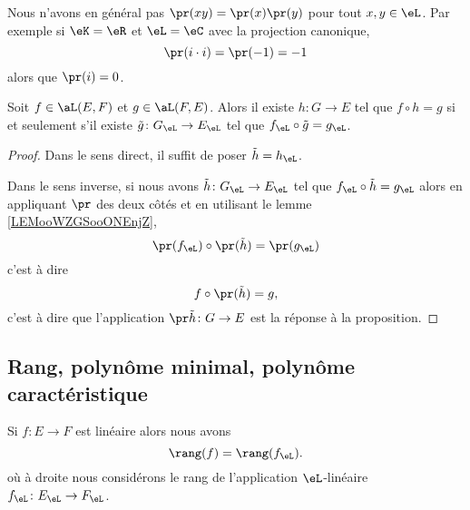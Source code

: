\begin{remark}
    Nous n'avons en général pas \( \pr(xy)=\pr(x)\pr(y)\) pour tout \( x,y\in \eL\). Par exemple si \( \eK=\eR\) et \( \eL=\eC\) avec la projection canonique,
    \begin{equation}
        \pr(i\cdot i)=\pr(-1)=-1
    \end{equation}
    alors que \( \pr(i)=0\).
\end{remark}

\begin{proposition}
    Soit \( f\in\aL(E,F)\) et \( g\in\aL(F,E)\). Alors il existe \( h\colon G\to E\) tel que \( f\circ h=g\) si et seulement s'il existe \( \tilde g\colon G_{\eL}\to E_{\eL}\) tel que \( f_{\eL}\circ \tilde g=g_{\eL}\).
\end{proposition}

\begin{proof}
    Dans le sens direct, il suffit de poser \( \tilde h=h_{\eL}\).

    Dans le sens inverse, si nous avons \( \tilde h\colon G_{\eL}\to E_{\eL}\) tel que \( f_{\eL}\circ\tilde h=g_{\eL}\) alors en appliquant \( \pr\) des deux côtés et en utilisant le lemme \ref{LEMooWZGSooONEnjZ},
    \begin{equation}
        \pr(f_{\eL})\circ\pr(\tilde h)=\pr(g_{\eL})
    \end{equation}
    c'est à dire
    \begin{equation}
        f\circ\pr(\tilde h)=g,
    \end{equation}
    c'est à dire que l'application \( \pr\tilde h\colon G\to E\) est la réponse à la proposition.
\end{proof}

\subsection{Rang, polynôme minimal, polynôme caractéristique}

\begin{proposition}     \label{PROPooJFQDooZSsxMf}
    Si \( f\colon E\to F\) est linéaire alors nous avons
    \begin{equation}
        \rang(f)=\rang(f_{\eL}).
    \end{equation}
    où à droite nous considérons le rang de l'application \( \eL\)-linéaire \( f_{\eL}\colon E_{\eL}\to F_{\eL}\).
\end{proposition}

